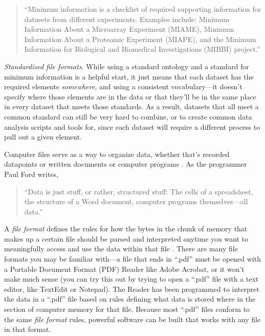 \documentclass[]{tufte-book}
\begin{document}
\begin{quote}
``Minimum information is a checklist of required supporting information for
datasets from different experiments. Examples include: Minimum Information About
a Microarray Experiment (MIAME), Minimum Information About a Proteomic
Experiment (MIAPE), and the Minimum Information for Biological and Biomedical
Investigations (MIBBI) project.'' \citep{ghosh2011software}
\end{quote}

\emph{Standardized file formats.} While using a standard ontology and a standard for
minimum information is a helpful start, it just means that each dataset has the
required elements \emph{somewhere}, and using a consistent vocabulary---it doesn't
specify where those elements are in the data or that they'll be in the same
place in every dataset that meets those standards. As a result, datasets that all
meet a common standard can still be very hard to combine, or to create common
data analysis scripts and tools for, since each dataset will require a different
process to pull out a given element.

Computer files serve as a way to organize data, whether that's recorded
datapoints or written documents or computer programs \citep{kernighan1984unix}. As
the programmer Paul Ford writes,

\begin{quote}
``Data is just stuff, or rather, structured stuff: The cells of a spreadsheet,
the structure of a Word document, computer programs themselves---all data.''
\citep{ford2015i}
\end{quote}

\noindent A \emph{file format} defines the rules for how the bytes in the chunk of
memory that makes up a certain file should be parsed and interpreted anytime you
want to meaningfully access and use the data within that file
\citep{murrell2009introduction}. There are many file formats you may be familiar
with---a file that ends in ``.pdf'' must be opened with a Portable Document Format
(PDF) Reader like Adobe Acrobat, or it won't make much sense (you can try this
out by trying to open a ``.pdf'' file with a text editor, like TextEdit or
Notepad). The Reader has been programmed to interpret the data in a ``.pdf'' file
based on rules defining what data is stored where in the section of computer
memory for that file. Because most ``.pdf'' files conform to the same \emph{file
format} rules, powerful software can be built that works with any file in that
format.
\end{document}

